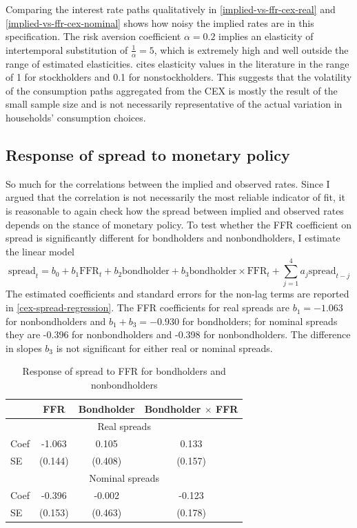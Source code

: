 Comparing the interest rate paths qualitatively in \autoref{implied-vs-ffr-cex-real} and \autoref{implied-vs-ffr-cex-nominal} shows how noisy the implied rates are in this specification. The risk aversion coefficient $\alpha = 0.2$ implies an elasticity of intertemporal substitution of $\frac{1}{\alpha} = 5$, which is extremely high and well outside the range of estimated elasticities. \cite{guvenen06} cites elasticity values in the literature in the range of 1 for stockholders and 0.1 for nonstockholders. This suggests that the volatility of the consumption paths aggregated from the CEX is mostly the result of the small sample size and is not necessarily representative of the actual variation in households' consumption choices.



\subsection{Response of spread to monetary policy}
So much for the correlations between the implied and observed rates. Since I argued that the correlation is not necessarily the most reliable indicator of fit, it is reasonable to again check how the spread between implied and observed rates depends on the stance of monetary policy. To test whether the FFR coefficient on spread is significantly different for bondholders and nonbondholders, I estimate the linear model
\begin{equation}
\label{spread-ffr-bondholder-regression}
\mathrm{spread}_t = b_0 + b_1 \mathrm{FFR}_t + b_2 \mathrm{bondholder} + b_3 \mathrm{bondholder} \times \mathrm{FFR}_t + \sum_{j=1}^4 a_j \mathrm{spread}_{t-j}
\end{equation}
The estimated coefficients and standard errors for the non-lag terms are reported in \autoref{cex-spread-regression}. The FFR coefficients for real spreads are $b_1 = -1.063$ for nonbondholders and $b_1 + b_3 = -0.930$ for bondholders; for nominal spreads they are -0.396 for nonbondholders and -0.398 for nonbondholders. The difference in slopes $b_3$ is not significant for either real or nominal spreads.

\begin{table}[b]
\centering
\caption{Response of spread to FFR for bondholders and nonbondholders}
\label{cex-spread-regression}
\begin{tabular}{lccc} \hline
& FFR & Bondholder & Bondholder $\times$ FFR \\ \hline
\multicolumn{4}{c}{Real spreads} \\ \hline
Coef & -1.063  & 0.105   & 0.133 \\
SE   & (0.144) & (0.408) & (0.157) \\ \hline
\multicolumn{4}{c}{Nominal spreads} \\ \hline
Coef & -0.396  & -0.002  & -0.123 \\
SE   & (0.153) & (0.463) & (0.178) \\ \hline
\end{tabular}
\end{table}

